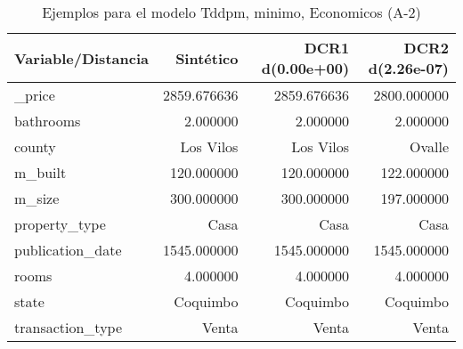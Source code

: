 \begin{table}[H]
\centering
\fontsize{10}{14}\selectfont
\caption{Ejemplos para el modelo Tddpm, minimo, Economicos (A-2)}
\label{table-example-economicos-a-2-tddpm_mlp-min}
\begin{tabular}{|l|r|r|r|}
\hline
\rowcolor[gray]{0.8}
Variable/Distancia & Sintético & DCR1 d(0.00e+00) & DCR2 d(2.26e-07) \\
\hline \_price & \cellcolor[rgb]{0.9, 0.54, 0.52} 2859.676636 & \cellcolor[rgb]{0.9, 0.54, 0.52} 2859.676636 & 2800.000000 \\
\hline bathrooms & \cellcolor[rgb]{0.9, 0.54, 0.52} 2.000000 & \cellcolor[rgb]{0.9, 0.54, 0.52} 2.000000 & \cellcolor[rgb]{0.9, 0.54, 0.52} 2.000000 \\
\hline county & \cellcolor[rgb]{0.9, 0.54, 0.52} Los Vilos & \cellcolor[rgb]{0.9, 0.54, 0.52} Los Vilos & Ovalle \\
\hline m\_built & \cellcolor[rgb]{0.9, 0.54, 0.52} 120.000000 & \cellcolor[rgb]{0.9, 0.54, 0.52} 120.000000 & 122.000000 \\
\hline m\_size & \cellcolor[rgb]{0.9, 0.54, 0.52} 300.000000 & \cellcolor[rgb]{0.9, 0.54, 0.52} 300.000000 & 197.000000 \\
\hline property\_type & \cellcolor[rgb]{0.9, 0.54, 0.52} Casa & \cellcolor[rgb]{0.9, 0.54, 0.52} Casa & \cellcolor[rgb]{0.9, 0.54, 0.52} Casa \\
\hline publication\_date & \cellcolor[rgb]{0.9, 0.54, 0.52} 1545.000000 & \cellcolor[rgb]{0.9, 0.54, 0.52} 1545.000000 & \cellcolor[rgb]{0.9, 0.54, 0.52} 1545.000000 \\
\hline rooms & \cellcolor[rgb]{0.9, 0.54, 0.52} 4.000000 & \cellcolor[rgb]{0.9, 0.54, 0.52} 4.000000 & \cellcolor[rgb]{0.9, 0.54, 0.52} 4.000000 \\
\hline state & \cellcolor[rgb]{0.9, 0.54, 0.52} Coquimbo & \cellcolor[rgb]{0.9, 0.54, 0.52} Coquimbo & \cellcolor[rgb]{0.9, 0.54, 0.52} Coquimbo \\
\hline transaction\_type & \cellcolor[rgb]{0.9, 0.54, 0.52} Venta & \cellcolor[rgb]{0.9, 0.54, 0.52} Venta & \cellcolor[rgb]{0.9, 0.54, 0.52} Venta \\
\hline
\end{tabular}
\end{table}
